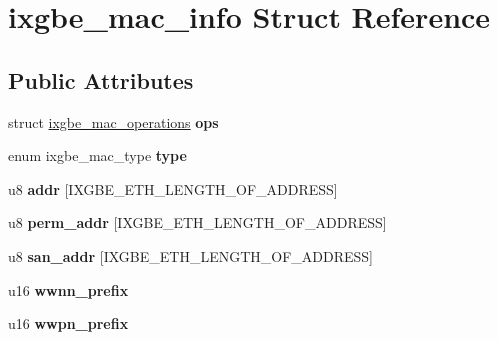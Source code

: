\hypertarget{structixgbe__mac__info}{
\section{ixgbe\_\-mac\_\-info Struct Reference}
\label{structixgbe__mac__info}
}
\subsection*{Public Attributes}
\begin{DoxyCompactItemize}
\item 
\hypertarget{structixgbe__mac__info_aeda5aaacbeda485d61d8e1601efa0404}{
struct \hyperlink{structixgbe__mac__operations}{ixgbe\_\-mac\_\-operations} {\bfseries ops}}
\label{structixgbe__mac__info_aeda5aaacbeda485d61d8e1601efa0404}

\item 
\hypertarget{structixgbe__mac__info_aad6aed214fb637784ddca4b894c54699}{
enum ixgbe\_\-mac\_\-type {\bfseries type}}
\label{structixgbe__mac__info_aad6aed214fb637784ddca4b894c54699}

\item 
\hypertarget{structixgbe__mac__info_a8ea8b651f9e47f626830c79e739abaad}{
u8 {\bfseries addr} \mbox{[}IXGBE\_\-ETH\_\-LENGTH\_\-OF\_\-ADDRESS\mbox{]}}
\label{structixgbe__mac__info_a8ea8b651f9e47f626830c79e739abaad}

\item 
\hypertarget{structixgbe__mac__info_ab840a9d9608038ef0926a3cced7de9dd}{
u8 {\bfseries perm\_\-addr} \mbox{[}IXGBE\_\-ETH\_\-LENGTH\_\-OF\_\-ADDRESS\mbox{]}}
\label{structixgbe__mac__info_ab840a9d9608038ef0926a3cced7de9dd}

\item 
\hypertarget{structixgbe__mac__info_a2dacc12c3f4805d2018b0a1c4db75c39}{
u8 {\bfseries san\_\-addr} \mbox{[}IXGBE\_\-ETH\_\-LENGTH\_\-OF\_\-ADDRESS\mbox{]}}
\label{structixgbe__mac__info_a2dacc12c3f4805d2018b0a1c4db75c39}

\item 
\hypertarget{structixgbe__mac__info_af1479447c2d10b6092d1afc5c4bd22e0}{
u16 {\bfseries wwnn\_\-prefix}}
\label{structixgbe__mac__info_af1479447c2d10b6092d1afc5c4bd22e0}

\item 
\hypertarget{structixgbe__mac__info_a8949b1e75138039a232a80e2a6534510}{
u16 {\bfseries wwpn\_\-prefix}}
\label{structixgbe__mac__info_a8949b1e75138039a232a80e2a6534510}


\end{DoxyCompactItemize}
